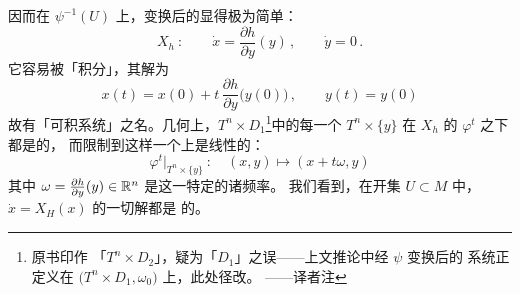 因而在 $\psi^{-1}(U)$ 上，变换后的\trHamiltonianSystem{}显得极为简单：
\[
X_{h}\ :\qquad \dot{x}=\frac{\partial h}{\partial y}(y)\,,\qquad \dot{y}=0\,.
\]
它容易被「积分」，其解为
\[
x(t)=x(0)+t\,\frac{\partial h}{\partial y}\bigl(y(0)\bigr)\,,\qquad y(t)=y(0)
\]
故有「可积系统」之名。几何上，$T^{n}\times D_{1}$\footnote{原书印作%
「$T^{n}\times D_{2}$」，疑为「$D_{1}$」之误——上文推论中经 $\psi$ 变换后的%
系统正定义在 $\bigl(T^{n}\times D_{1},\omega_{0}\bigr)$ 上，此处径改。%
——译者注}中的每一个\trTorus{}%
$T^{n}\times\{y\}$ 在 $X_{h}$ 的\trFlow{} $\varphi^{t}$ 之下都是\trInvariant{}的，%
而限制到这样一个\trTorus{}上是线性的：
\[
\varphi^{t}\big|_{T^{n}\times\{y\}}\ :\quad(x,y)\mapsto(x+t\omega,y)
\]
其中 $\omega=\frac{\partial h}{\partial y}(y)\in\mathbb{R}^{n}$ 是这一特定\trTorus{}的诸频率。%
我们看到，在开集 $U\subset M$ 中，$\dot{x}=X_{H}(x)$ 的一切解都是%
\trQuasiPeriodic{}的。

